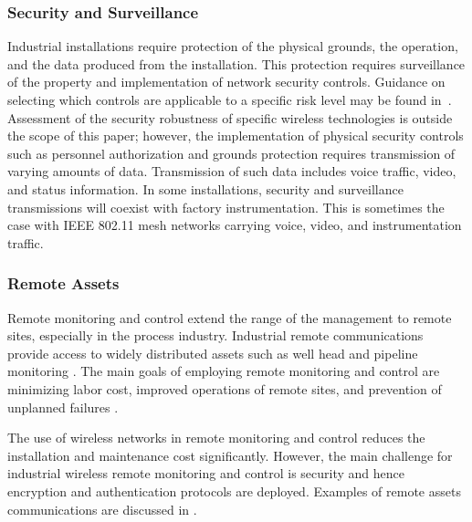     
    \subsubsection{Security and Surveillance}  
    Industrial installations require protection of the physical grounds, the operation, and the data produced from the installation.  This protection requires surveillance of the property and implementation of network security controls. Guidance on selecting which controls are applicable to a specific risk level may be found in~\cite{Stouffer2015}. Assessment of the security robustness of specific wireless technologies is outside the scope of this paper; however, the implementation of physical security controls such as personnel authorization and grounds protection requires transmission of varying amounts of data.  Transmission of such data includes voice traffic, video, and status information.  In some installations, security and surveillance transmissions will coexist with factory instrumentation.  This is sometimes the case with IEEE 802.11 mesh networks carrying voice, video, and instrumentation traffic.  
    
    \subsubsection{Remote Assets} 
Remote monitoring and control extend the range of the management to remote sites, especially in the process industry. Industrial remote communications provide access to widely distributed assets such as well head and pipeline monitoring \cite{PS-remote2}. The main goals of employing remote monitoring and control are minimizing labor cost, improved operations of remote sites, and prevention of  unplanned failures \cite{PS-remote1}. 

The use of wireless networks in remote monitoring and control reduces the installation and maintenance cost significantly. However, the main challenge for industrial wireless remote monitoring and control is security and hence encryption and authentication protocols are deployed. Examples of remote assets communications are discussed in \cite{PS-remote2}.      
    
